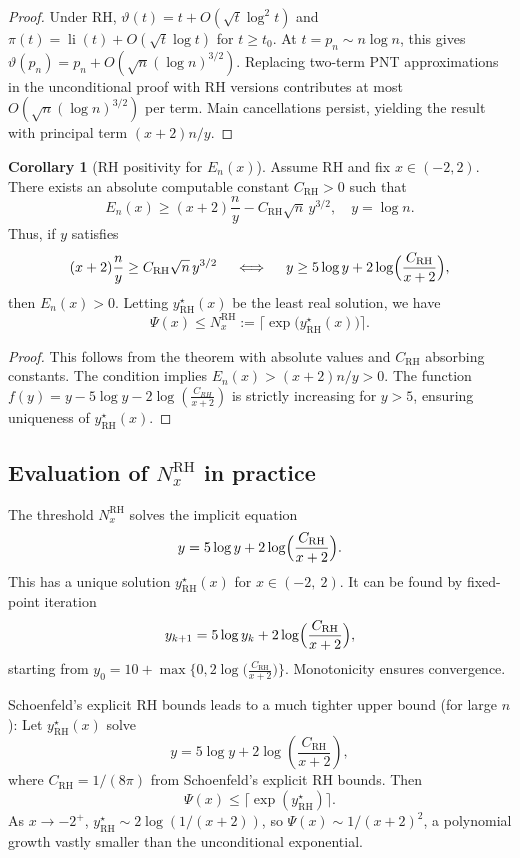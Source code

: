 \documentclass[10pt]{amsart}
\theoremstyle{definition} %
\newtheorem{corollary}{Corollary}[section]
\numberwithin{equation}{section}
\newcommand{\li}{\operatorname{li}}
\begin{document}
\begin{proof}
Under RH, \(\vartheta(t) = t + O(\sqrt{t} \log^2 t)\) and \(\pi(t) = \li(t) + O(\sqrt{t} \log t)\) for \(t \ge t_0\). At \(t = p_n \sim n \log n\), this gives \(\vartheta(p_n) = p_n + O(\sqrt{n} (\log n)^{3/2})\). Replacing two-term PNT approximations in the unconditional proof with RH versions contributes at most \(O(\sqrt{n} (\log n)^{3/2})\) per term. Main cancellations persist, yielding the result with principal term \((x+2)n / y\).
\end{proof}

\begin{corollary}[RH positivity for \(E_n(x)\)]
Assume RH and fix \(x \in (-2,2)\). There exists an absolute computable constant \(C_{\mathrm{RH}} > 0\) such that 
\[
E_n(x) \ge (x+2) \frac{n}{y} - C_{\mathrm{RH}} \sqrt{n} \, y^{3/2}, \quad y = \log n.
\]
Thus, if \(y\) satisfies 
\[
 (x+2) \frac{n}{y} \ge  C_{\mathrm{RH}} \sqrt{n} \, y^{3/2} \quad \iff \quad y \ge 5 \log y + 2 \log \Bigl( \frac{C_{\mathrm{RH}}}{x+2} \Bigr),
\]
then \(E_n(x) > 0\). Letting \(y^\star_{\mathrm{RH}}(x)\) be the least real solution, we have 
\[
\Psi(x) \le N_x^{\mathrm{RH}} := \bigl\lceil \exp\bigl(y^\star_{\mathrm{RH}}(x)\bigr) \bigr\rceil.
\]
\end{corollary}

\begin{proof}
This follows from the theorem with absolute values and \(C_{\mathrm{RH}}\) absorbing constants. The condition implies \(E_n(x) > (x+2) n / y > 0\). The function \(f(y) = y - 5 \log y-2\log (\frac{C_{RH}}{x+2})\) is strictly increasing for \(y > 5\), ensuring uniqueness of \(y^\star_{\mathrm{RH}}(x)\).
\end{proof}

\subsection*{Evaluation of \(N_x^{\mathrm{RH}}\) in practice}

The threshold \(N_x^{\mathrm{RH}}\) solves the implicit equation 
\[
y = 5 \log y + 2\log \Bigl( \frac{C_{\mathrm{RH}}}{x+2} \Bigr).
\]
This has a unique solution \(y^\star_{\mathrm{RH}}(x)\) for \(x \in (-2,\ 2)\). It can be found by fixed-point iteration 
\[
y_{k+1} = 5 \log y_k + 2\log \Bigl( \frac{C_{\mathrm{RH}}}{x+2} \Bigr),
\]
starting from \(y_0 = 10 + \max\bigl\{0, 2 \log \bigl( \frac{C_{\mathrm{RH}}}{x+2} \bigr) \bigr\}\). Monotonicity ensures convergence.

 Schoenfeld's explicit RH bounds leads to a much tighter upper bound (for large $n$): Let \(y^\star_{\mathrm{RH}}(x)\) solve
\[
y = 5 \log y + 2 \log \left( \frac{C_{\mathrm{RH}}}{x + 2} \right),
\]
where \(C_{\mathrm{RH}} = 1/(8\pi)\) from Schoenfeld's explicit RH bounds. Then
\[
\Psi(x) \leq \lceil \exp(y^\star_{\mathrm{RH}}) \rceil.
\]
As \(x \to -2^+\), \(y^\star_{\mathrm{RH}} \sim 2 \log(1/(x+2))\), so \(\Psi(x) \sim 1/(x+2)^2\), a polynomial growth vastly smaller than the unconditional exponential.
\end{document}

